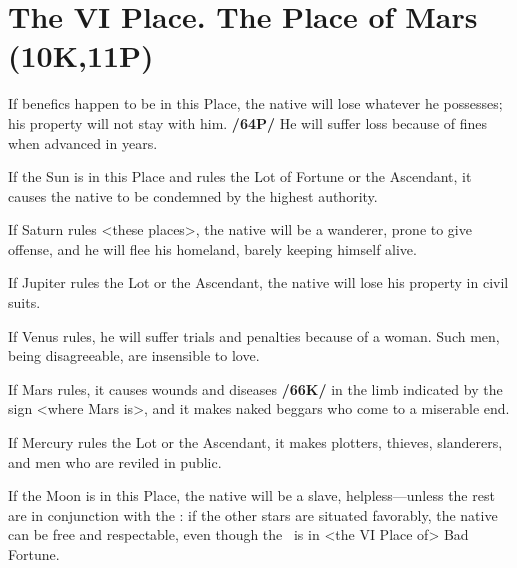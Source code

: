 \section{The VI Place. The Place of Mars (10K,11P)}
If benefics happen to be in this Place, the native will lose whatever he possesses; his property will not stay with him. \textbf{/64P/} He will suffer loss because of fines when advanced in years. 

If the Sun is in this Place and rules the Lot of Fortune or the Ascendant, it causes the native to be condemned by the highest authority. 

If Saturn rules <these places>, the native will be a wanderer, prone to give offense, and he will flee his homeland, barely keeping himself alive. 

If Jupiter rules the Lot or the Ascendant, the native will lose his property in civil suits. 

If Venus rules, he will suffer trials and penalties because of a woman. Such men, being disagreeable, are insensible to love. 

If Mars rules, it causes wounds and diseases \textbf{/66K/} in the limb indicated by the sign <where Mars is>, and it makes naked beggars who come to a miserable end. 

If Mercury rules the Lot or the Ascendant, it makes plotters, thieves, slanderers, and men who are reviled in public. 

If the Moon is in this Place, the native will be a slave, helpless—unless the rest are in conjunction with the \Moon: if the other stars are situated favorably, the native can be free and respectable, even though the \Moon\, is in <the VI Place of> Bad Fortune.

\newpage